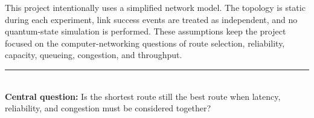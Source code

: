 \documentclass[11pt]{article}
\begin{document}
This project intentionally uses a simplified network model. The topology is static during each experiment, link success events are treated as independent, and no quantum-state simulation is performed. These assumptions keep the project focused on the computer-networking questions of route selection, reliability, capacity, queueing, congestion, and throughput.

\vfill
\begin{center}
\rule{0.78\textwidth}{0.4pt}\\[-1pt]
\textbf{Central question:} Is the shortest route still the best route when latency, reliability, and congestion must be considered together?
\end{center}
\end{document}
